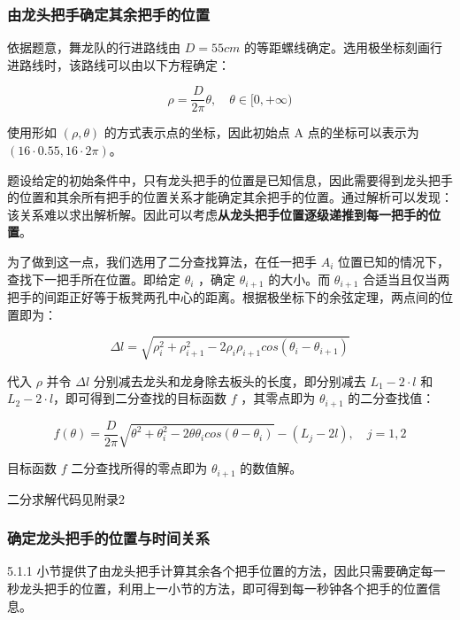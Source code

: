 \documentclass[a4paper]{article}
\begin{document}
	\subsubsection{由龙头把手确定其余把手的位置}
	
		依据题意，舞龙队的行进路线由 $D = 55cm$ 的等距螺线确定。选用极坐标刻画行进路线时，该路线可以由以下方程确定：
		
		\begin{equation}
			\rho = \frac{D}{2\pi}\theta, \quad \theta \in [0,+\infty)
		\end{equation}
		
		使用形如 $(\rho, \theta)$ 的方式表示点的坐标，因此初始点 A 点的坐标可以表示为 $( 16 \cdot 0.55, 16 \cdot 2\pi )$。
		
		题设给定的初始条件中，只有龙头把手的位置是已知信息，因此需要得到龙头把手的位置和其余所有把手的位置关系才能确定其余把手的位置。通过解析可以发现：该关系难以求出解析解。因此可以考虑\textbf{从龙头把手位置逐级递推到每一把手的位置}。
		
		为了做到这一点，我们选用了二分查找算法，在任一把手 $A_i$ 位置已知的情况下，查找下一把手所在位置。即给定 $\theta_{i}$ ，确定 $\theta_{i+1}$ 的大小。而 $\theta_{i+1}$ 合适当且仅当两把手的间距正好等于板凳两孔中心的距离。根据极坐标下的余弦定理，两点间的位置即为：
		
		$$\Delta l = \sqrt{\rho_i^2 + \rho_{i+1}^2 - 2\rho_i \rho_{i+1} cos(\theta_i - \theta_{i+1})}$$
		
		代入 $\rho$ 并令 $\Delta l$ 分别减去龙头和龙身除去板头的长度，即分别减去 $L_1 - 2 \cdot l$ 和 $L_2 - 2 \cdot l$，即可得到二分查找的目标函数 $f$ ，其零点即为 $\theta_{i+1}$ 的二分查找值：
		
		\begin{equation}
			f(\theta) = \frac{D}{2\pi} \sqrt{\theta^2 + \theta_i^2 - 2\theta \theta_i cos(\theta - \theta_i)} - (L_j - 2l), \quad j=1, 2
		\end{equation} 
		
		目标函数 $f$ 二分查找所得的零点即为 $\theta_{i+1}$ 的数值解。
		
		二分求解代码见附录2 %
	
	\subsubsection{确定龙头把手的位置与时间关系}
	
		5.1.1 小节提供了由龙头把手计算其余各个把手位置的方法，因此只需要确定每一秒龙头把手的位置，利用上一小节的方法，即可得到每一秒钟各个把手的位置信息。
		
\end{document}
